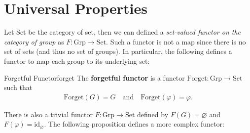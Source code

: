 \documentclass[math]{amznotes}
\theoremstyle{remark}
\newcommand{\0}{\mathbf{0}}
\newcommand{\1}{\mathbf{1}}
\begin{document}
\section{Universal Properties}
Let $\mathrm{Set}$ be the category of set, then we can defined a \textit{set-valued functor on the category of group} as $F \colon \mathrm{Grp} \to \mathrm{Set}$. Such a functor is not a map since there is no set of sets (and thus no set of groups). In particular, the following defines a functor to map each group to its underlying set:
\begin{dfnbox}{Forgetful Functor}{forget}
    The {\color{red} \textbf{forgetful functor}} is a functor $\mathrm{Forget} \colon \mathrm{Grp} \to \mathrm{Set}$ such that 
    \begin{align*}
        \mathrm{Forget}\left(G\right) = G \quad\textrm{and}\quad \mathrm{Forget}\left(\varphi\right) = \varphi.
    \end{align*}
\end{dfnbox}
There is also a trivial functor $F \colon \mathrm{Grp} \to \mathrm{Set}$ defined by $F\left(G\right) = \varnothing$ and $F\left(\varphi\right) = \mathrm{id}_{\varnothing}$. The following proposition defines a more complex functor:
\end{document}
